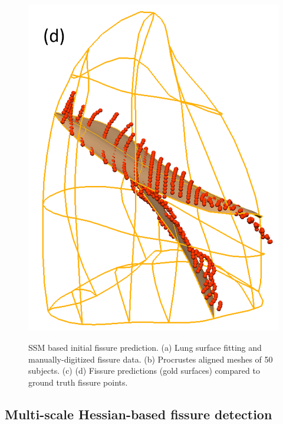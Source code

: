 \documentclass[]{spie}  %
\begin{document}
{\begin{figure}[htbp]
\begin{subfigure}
{\begin{minipage}[t]{0.2\linewidth}
  \includegraphics[width=\linewidth,trim={{.0\wd0} {.0\wd0} {.0\wd0} {.0\wd0}},clip]{Image/ProjectedRightFissureMesh.png}
  \centerline{}
  \label{fig:InitialFissurePrediction-d}
	\end{minipage}
	}
\end{subfigure}
\caption{SSM based initial fissure prediction. (a) Lung surface fitting and manually-digitized fissure data. (b) Procrustes aligned meshes of 50 subjects. (c) (d) Fissure predictions (gold surfaces) compared to ground truth fissure points.}
\label{fig:InitialFissurePrediction}
\end{figure}

\subsection{Multi-scale Hessian-based fissure detection}

}
\end{document}
